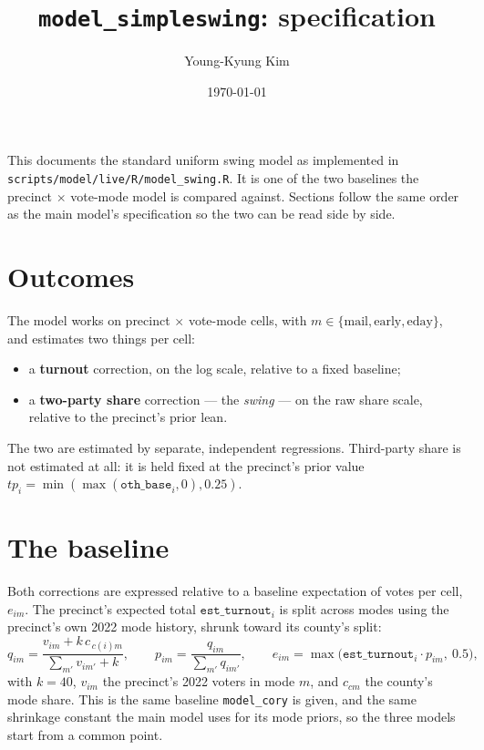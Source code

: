 \documentclass[11pt]{article}
\title{\texttt{model\_simpleswing}: specification}
\author{Young-Kyung Kim}
\date{\today}
\newcommand{\var}[1]{\texttt{#1}}
\begin{document}
\maketitle

\noindent
This documents the standard uniform swing model as implemented in
\var{scripts/model/live/R/model\_swing.R}. It is one of the two baselines the precinct
$\times$ vote-mode model is compared against. Sections follow the same order as the main model's specification so
the two can be read side by side.

\section{Outcomes}

The model works on precinct $\times$ vote-mode cells, with
$m \in \{\text{mail}, \text{early}, \text{eday}\}$, and estimates two things per cell:

\begin{itemize}
  \item a \textbf{turnout} correction, on the log scale, relative to a fixed baseline;
  \item a \textbf{two-party share} correction --- the \emph{swing} --- on the raw share
        scale, relative to the precinct's prior lean.
\end{itemize}

The two are estimated by separate, independent regressions. Third-party share is not
estimated at all: it is held fixed at the precinct's prior value
$tp_i = \min(\max(\var{oth\_base}_i, 0), 0.25)$.

\section{The baseline}

Both corrections are expressed relative to a baseline expectation of votes per cell,
$e_{im}$. The precinct's expected total $\var{est\_turnout}_i$ is split across modes using
the precinct's own 2022 mode history, shrunk toward its county's split:
\begin{equation}
  q_{im} = \frac{v_{im} + k\, c_{\,c(i)m}}{\textstyle\sum_{m'} v_{im'} + k},
  \qquad
  p_{im} = \frac{q_{im}}{\sum_{m'} q_{im'}},
  \qquad
  e_{im} = \max\big(\var{est\_turnout}_i \cdot p_{im},\ 0.5\big),
  \label{eq:base}
\end{equation}
with $k = 40$, $v_{im}$ the precinct's 2022 voters in mode $m$, and $c_{cm}$ the county's
mode share. This is the same baseline \texttt{model\_cory} is given, and the same shrinkage
constant the main model uses for its mode priors, so the three models start from a common
point.
\end{document}
